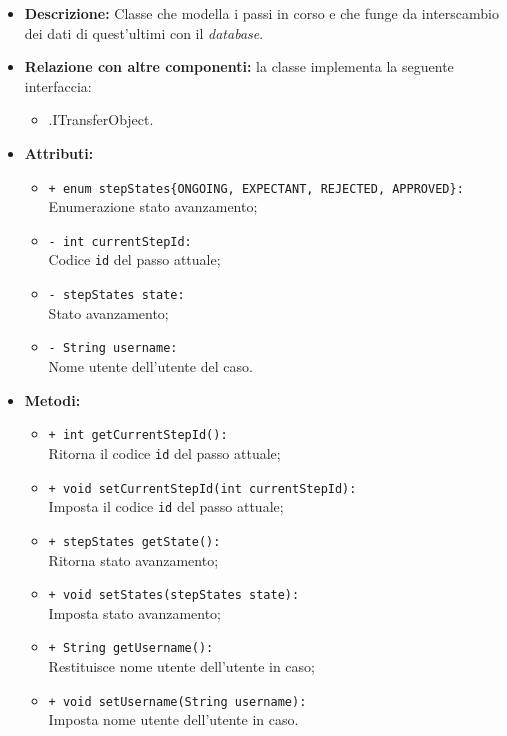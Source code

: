 \begin{flushleft}
\begin{itemize}
\item \textbf{Descrizione:} Classe che modella i passi in corso e che funge da interscambio dei dati di quest'ultimi con il \textit{database}.
\item \textbf{Relazione con altre componenti:} la classe implementa la seguente interfaccia:
		\begin{itemize}
			\item \smodel{}.ITransferObject.
		\end{itemize}
\item \textbf{Attributi:}
\begin{sloppypar}
\begin{itemize}
\item \texttt{+ enum stepStates\{ONGOING, EXPECTANT, REJECTED, APPROVED\}:}\\ Enumerazione stato avanzamento;
\item \texttt{- int currentStepId:}\\ Codice \texttt{id} del passo attuale;
\item \texttt{- stepStates state:}\\ Stato avanzamento;
\item \texttt{- String username:}\\ Nome utente dell'utente del caso.
\end{itemize}
\end{sloppypar}
\item \textbf{Metodi:}
\begin{sloppypar}
\begin{itemize}
\item \texttt{+ int getCurrentStepId():}\\ Ritorna il codice \texttt{id} del passo attuale;
\item \texttt{+ void setCurrentStepId(int currentStepId):}\\ Imposta il codice \texttt{id} del passo attuale;
\item \texttt{+ stepStates getState():}\\ Ritorna stato avanzamento;
\item \texttt{+ void setStates(stepStates state):}\\ Imposta stato avanzamento;
\item \texttt{+ String getUsername():}\\ Restituisce nome utente dell'utente in caso;
\item \texttt{+ void setUsername(String username):}\\ Imposta nome utente dell'utente in caso.
\end{itemize}
\end{sloppypar}
\end{itemize}
\end{flushleft}

